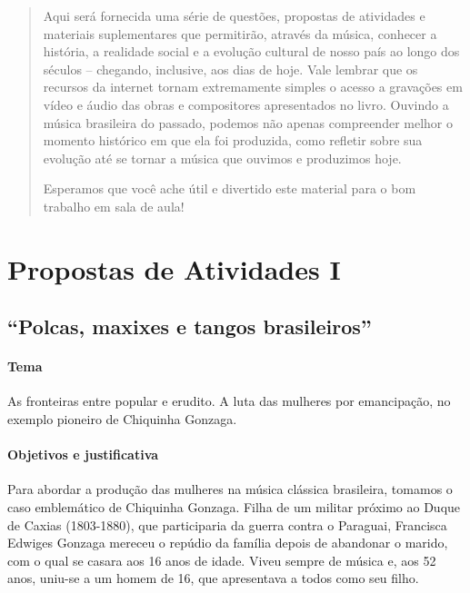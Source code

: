 \documentclass[11pt]{extarticle}
\begin{document}
\begin{abstract}
Aqui será fornecida uma série de questões, propostas de atividades e
materiais suplementares que permitirão, através da música, conhecer a
história, a realidade social e a evolução cultural de nosso país ao
longo dos séculos -- chegando, inclusive, aos dias de hoje. Vale lembrar
que os recursos da internet tornam extremamente simples o acesso a
gravações em vídeo e áudio das obras e compositores apresentados no
livro. Ouvindo a música brasileira do passado, podemos não apenas
compreender melhor o momento histórico em que ela foi produzida, como
refletir sobre sua evolução até se tornar a música que ouvimos e
produzimos hoje.

Esperamos que você ache útil e divertido este material para o bom
trabalho em sala de aula!

\end{abstract}

\tableofcontents


\section{Propostas de Atividades I}

\subsection{``Polcas, maxixes e tangos brasileiros''}

\paragraph{Tema} As fronteiras entre popular e erudito. A luta das
mulheres por emancipação, no exemplo pioneiro de Chiquinha Gonzaga.

\paragraph{Objetivos e justificativa}

Para abordar a produção das mulheres na música clássica brasileira,
tomamos o caso emblemático de Chiquinha Gonzaga. Filha de um militar
próximo ao Duque de Caxias (1803-1880), que participaria da guerra
contra o Paraguai, Francisca Edwiges Gonzaga mereceu o repúdio da
família depois de abandonar o marido, com o qual se casara aos 16 anos
de idade. Viveu sempre de música e, aos 52 anos, uniu-se a um homem de
16, que apresentava a todos como seu filho.
\end{document}
